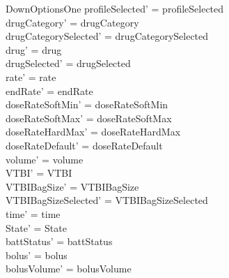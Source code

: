 \begin{schema}{DownOptionsOne}
	profileSelected' = profileSelected\\
	drugCategory' = drugCategory\\ 
	drugCategorySelected' = drugCategorySelected\\
	drug' = drug\\ 
	drugSelected' = drugSelected\\
	rate' = rate\\
	endRate' = endRate\\
	doseRateSoftMin' = doseRateSoftMin\\
	doseRateSoftMax' = doseRateSoftMax\\
	doseRateHardMax' = doseRateHardMax\\
	doseRateDefault' = doseRateDefault\\
	volume' = volume\\
	VTBI' = VTBI\\
	VTBIBagSize' = VTBIBagSize\\ VTBIBagSizeSelected' = VTBIBagSizeSelected\\
	\pagebreak
	time' = time\\ 
	State' = State\\
	battStatus' = battStatus\\
	bolus' = bolus\\
	bolusVolume' = bolusVolume\\

\end{schema}
